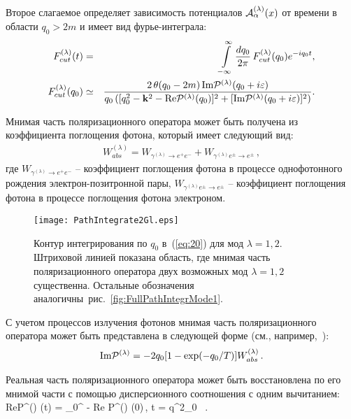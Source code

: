 Второе слагаемое определяет зависимость потенциалов ${\cal A}^{(\lambda)}_\alpha(x)$ от времени
в области $q_0>2m$ и имеет вид
фурье-интеграла:
%
\begin{eqnarray}
F^{(\lambda)}_{cut}(t) &=& \int \limits_{- \infty}^{\infty} \frac{dq_0}{2 \pi}\,
F^{(\lambda)}_{cut}(q_0)e^{- i q_0 t},
\label{eq:20} 
\\
F^{(\lambda)}_{cut}(q_0) &\simeq& 
\frac{2 \,\theta (q_0  -  2 m)\,\text{Im}{\cal 
		P}^{(\lambda)}(q_0 + i \varepsilon)}
{q_0\,([ q_0^2 - {\bf k}^2 - \text{Re} {\cal P}^{(\lambda)}(q_0)]^2 + 
[\text{Im}{\cal 
P}^{(\lambda)}(q_0 + i \varepsilon)]^2)}.
\label{eq:21}
\end{eqnarray}

Мнимая часть поляризационного оператора может быть получена из коэффициента  
поглощения фотона, который имеет следующий вид:
\begin{eqnarray}
W^{(\lambda)}_{abs} = W_{\gamma^{(\lambda)} \to e^+ e^-} + 
W_{\gamma^{(\lambda)} e^{\pm} \to e^{\pm}} \, ,
\label{eq:Wabs}
\end{eqnarray}
где $W_{\gamma^{(\lambda)} \to e^+ e^-}$ -- коэффициент поглощения фотона в процессе однофотонного рождения электрон-позитронной пары, $W_{\gamma^{(\lambda)} e^{\pm} \to e^{\pm}}$ -- коэффициент поглощения фотона в процессе поглощения фотона электроном.

\begin{figure}[t]\centering
	\texttt{[image: PathIntegrate2Gl.eps]}
	\caption{Контур интегрирования по $q_0$ в~(\ref{eq:20}) для мод $\lambda = 1,2$. Штриховой линией показана область, где мнимая часть поляризационного оператора двух возможных мод $\lambda = 1,2$ существенна. Остальные обозначения аналогичны~рис.~\ref{fig:FullPathIntegrMode1}.}\label{fig:PathIntegr}
\end{figure}

С учетом процессов излучения фотонов мнимая часть поляризационного оператора 
может быть представлена в 
следующей форме (см., например,~\cite{Shabad:1988, 
Rumyantsev:2017,Weldon:1983}): 
\begin{eqnarray}\label{eq:Ilambda}
\text{Im} {\cal P}^{(\lambda)} =  -2 q_0 [1-\exp (-q_0/T)] W^{(\lambda)}_{abs} 
\, . 
\label{eq:ImP}
\end{eqnarray}

Реальная часть 
поляризационного оператора может быть восстановлена по его мнимой части с помощью дисперсионного соотношения с одним 
вычитанием:
%
\beq 
\textrm{Re}{\cal P}^{(\lambda)} (t) = \int \limits_0^\infty 
{} - \textrm{Re}{\cal 
P}^{(\lambda)} (0)\,, \qquad  t = q^2_0 \, .
\label{eq:Disp}
\eeq

